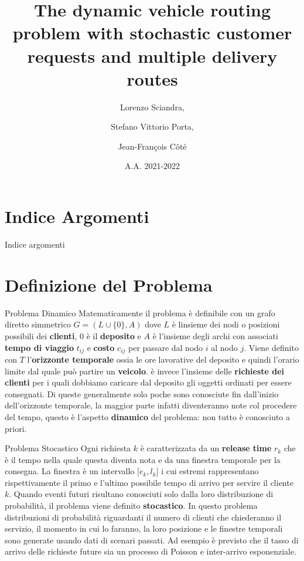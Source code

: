 \documentclass[10pt]{beamer}
\title{The dynamic vehicle routing problem with stochastic customer requests and multiple delivery routes}
\author{Lorenzo Sciandra, \and Stefano Vittorio Porta, \and \newline Jean-François Côté\\}
\date{A.A. 2021-2022}
\institute{Università degli Studi di Torino}
\begin{document}
    \maketitle

    \section{Indice Argomenti}\label{sec:indice-argomenti}

    \begin{frame}{Indice argomenti}
    \end{frame}
    
    \section{Definizione del Problema}\label{sec:def-problema}

    \begin{frame}{Problema Dinamico}
       Matematicamente il problema è definibile con un grafo diretto simmetrico {\(G = (L \cup \{ 0\},A)\)} dove {\(L\)} è l\textquotesingle insieme dei nodi o posizioni possibili dei \textbf{clienti}, {\(0\)} è il \textbf{deposito} e {\(A\)} è l'insieme degli archi con associati \textbf{tempo di viaggio} {\(t_{ij}\)} e \textbf{costo} {\(c_{ij}\)} per passare dal nodo {\(i\)} al nodo {\(j\)}. \newline Viene definito con {\(T\)} l'\textbf{orizzonte temporale} ossia le ore lavorative del deposito e quindi l'orario limite dal quale può partire un \textbf{veicolo}.  è invece l'insieme delle \textbf{richieste dei clienti} per i quali dobbiamo caricare dal deposito gli oggetti ordinati per essere consegnati. Di queste generalmente solo poche sono conosciute fin dall'inizio dell'orizzonte temporale, la maggior parte infatti diventeranno note col procedere del tempo, questo è l'aspetto \textbf{dinamico} del problema: non tutto è conosciuto a priori.
    \end{frame}

    \begin{frame}{Problema Stocastico}  
    Ogni richiesta {\(k\)} è caratterizzata da un \textbf{release time} {\(r_{k}\)} che è il tempo nella quale questa diventa nota e da una finestra temporale per la consegna. La finestra è un intervallo {\(\lbrack e_{k},l_{k}\rbrack\)} i cui estremi rappresentano rispettivamente il primo e l'ultimo possibile tempo di arrivo per servire il cliente $k$. \newline Quando eventi futuri risultano conosciuti solo dalla loro distribuzione di probabilità, il problema viene definito \textbf{stocastico}. In questo problema distribuzioni di probabilità riguardanti il numero di clienti che chiederanno il servizio, il momento in cui lo faranno, la loro posizione e le finestre temporali sono generate usando dati di scenari passati. Ad esempio è previsto che il tasso di arrivo delle richieste future sia un processo di Poisson e inter-arrivo esponenziale.
    \end{frame}
    
\end{document}
